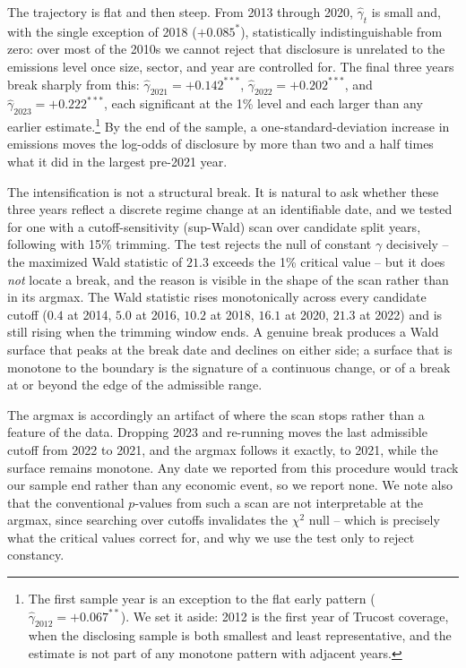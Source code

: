 \documentclass[a4paper,12pt]{article}
\newcommand{\citet}[1]{\textcite{#1}}
\begin{document}
The trajectory is flat and then steep. From 2013 through 2020, $\hat\gamma_t$ is small and, with the single exception of 2018 ($+0.085^{*}$), statistically indistinguishable from zero: over most of the 2010s we cannot reject that disclosure is unrelated to the emissions level once size, sector, and year are controlled for. The final three years break sharply from this: $\hat\gamma_{2021} = +0.142^{***}$, $\hat\gamma_{2022} = +0.202^{***}$, and $\hat\gamma_{2023} = +0.222^{***}$, each significant at the 1\% level and each larger than any earlier estimate.\footnote{The first sample year is an exception to the flat early pattern ($\hat\gamma_{2012} = +0.067^{**}$). We set it aside: 2012 is the first year of Trucost coverage, when the disclosing sample is both smallest and least representative, and the estimate is not part of any monotone pattern with adjacent years.} By the end of the sample, a one-standard-deviation increase in emissions moves the log-odds of disclosure by more than two and a half times what it did in the largest pre-2021 year.

The intensification is not a structural break. It is natural to ask whether these three years reflect a discrete regime change at an identifiable date, and we tested for one with a cutoff-sensitivity (sup-Wald) scan over candidate split years, following \citet{andrews1993tests} with 15\% trimming. The test rejects the null of constant $\gamma$ decisively -- the maximized Wald statistic of $21.3$ exceeds the 1\% critical value -- but it does \emph{not} locate a break, and the reason is visible in the shape of the scan rather than in its argmax. The Wald statistic rises monotonically across every candidate cutoff ($0.4$ at 2014, $5.0$ at 2016, $10.2$ at 2018, $16.1$ at 2020, $21.3$ at 2022) and is still rising when the trimming window ends. A genuine break produces a Wald surface that peaks at the break date and declines on either side; a surface that is monotone to the boundary is the signature of a continuous change, or of a break at or beyond the edge of the admissible range.

The argmax is accordingly an artifact of where the scan stops rather than a feature of the data. Dropping 2023 and re-running moves the last admissible cutoff from 2022 to 2021, and the argmax follows it exactly, to 2021, while the surface remains monotone. Any date we reported from this procedure would track our sample end rather than any economic event, so we report none. We note also that the conventional $p$-values from such a scan are not interpretable at the argmax, since searching over cutoffs invalidates the $\chi^2$ null -- which is precisely what the \citet{andrews1993tests} critical values correct for, and why we use the test only to reject constancy.
\end{document}
